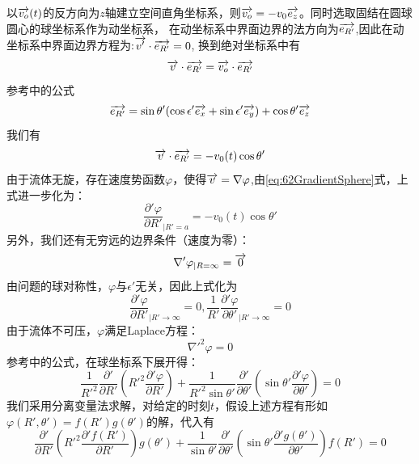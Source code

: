 以$\overrightarrow{v_o}(t)$的反方向为$z$轴建立空间直角坐标系，则$\overrightarrow{v_o}=-v_0\overrightarrow{e_z}$。同时选取固结在圆球圆心的球坐标系作为动坐标系，
在动坐标系中界面边界的法方向为$\overrightarrow{e_{R'}}$,因此在动坐标系中界面边界方程为:$\overrightarrow{v'}\cdot \overrightarrow{e_{R'}}=0$,
换到绝对坐标系中有
\begin{equation}
\overrightarrow{v}\cdot\overrightarrow{e_{R'}}=\overrightarrow{v_o}\cdot \overrightarrow{e_{R'}}
\end{equation}
参考\cite{Del}中的公式
\begin{equation}\label{eq:72Erxyz}
\overrightarrow{e_{R'}}=\sin\theta'(\cos\epsilon' \overrightarrow{e_x}+\sin\epsilon' \overrightarrow{e_y})+\cos\theta' \overrightarrow{e_z}
\end{equation}
我们有
\begin{equation}
\overrightarrow{v}\cdot\overrightarrow{e_{R'}}=-v_0(t)\cos\theta'
\end{equation}
由于流体无旋，存在速度势函数$\varphi$，使得$\overrightarrow{v}=\nabla \varphi$,由\eqref{eq:62GradientSphere}式，上式进一步化为：
\begin{equation}\label{eq:72GSBC}
\frac{\partial' \varphi}{\partial R'}_{| R'=a}=-v_0(t)\cos\theta'
\end{equation}
另外，我们还有无穷远的边界条件（速度为零）：
\begin{equation}
\nabla'\varphi_{|R=\infty}=\overrightarrow{0}
\end{equation}
由问题的球对称性，$\varphi$与$\epsilon'$无关，因此上式化为
\begin{equation}\label{eq:72InfityBC}
\frac{\partial' \varphi}{\partial R'}_{| R'\to \infty}=0,\frac{1}{R'}\frac{\partial' \varphi}{\partial \theta'}_{| R'\to \infty}=0
\end{equation}
由于流体不可压，$\varphi$满足Laplace方程：
\begin{equation}
\nabla'^2 \varphi=0
\end{equation}
参考\cite{Del}中的公式，在球坐标系下展开得：
\begin{equation}
\frac{1}{R'^2}\frac{\partial'}{\partial R'}\left(R'^2 \frac{\partial' \varphi}{\partial R'}\right)
+\frac{1}{R'^2\sin\theta'}\frac{\partial'}{\partial \theta'}\left(\sin\theta' \frac{\partial' \varphi}{\partial \theta'}\right)
=0
\end{equation}
我们采用分离变量法求解，对给定的时刻$t$，假设上述方程有形如$\varphi(R',\theta')=f(R')g(\theta')$的解，代入有
\begin{equation}
\frac{\partial'}{\partial R'}\left(R'^2 \frac{\partial' f(R')}{\partial R'}\right)g(\theta')
+\frac{1}{\sin\theta'}\frac{\partial'}{\partial \theta'}\left(\sin\theta' \frac{\partial' g(\theta')}{\partial \theta'}\right)f(R')
=0
\end{equation}
